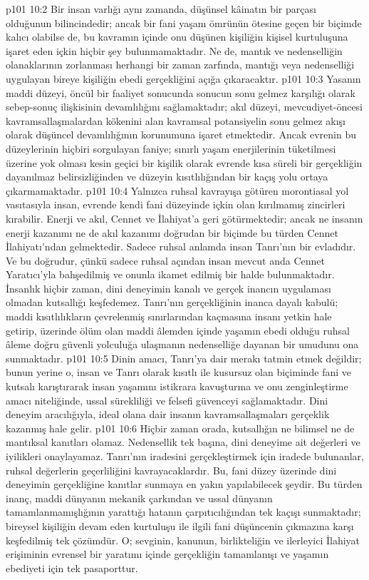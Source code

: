 \vs p101 10:2 Bir insan varlığı aynı zamanda, düşünsel kâinatın bir parçası olduğunun bilincindedir; ancak bir fani yaşam ömrünün ötesine geçen bir biçimde kalıcı olabilse de, bu kavramın içinde onu düşünen kişiliğin kişisel kurtuluşuna işaret eden içkin hiçbir şey bulunmamaktadır. Ne de, mantık ve nedenselliğin olanaklarının zorlanması herhangi bir zaman zarfında, mantığı veya nedenselliği uygulayan bireye kişiliğin ebedi gerçekliğini açığa çıkaracaktır.
\vs p101 10:3 Yasanın maddi düzeyi, öncül bir faaliyet sonucunda sonucun sonu gelmez karşılığı olarak sebep\hyp{}sonuç ilişkisinin devamlılığını sağlamaktadır; akıl düzeyi, mevcudiyet\hyp{}öncesi kavramsallaşmalardan kökenini alan kavramsal potansiyelin sonu gelmez akışı olarak düşüncel devamlılığının korunumuna işaret etmektedir. Ancak evrenin bu düzeylerinin hiçbiri sorgulayan faniye; sınırlı yaşam enerjilerinin tüketilmesi üzerine yok olması kesin geçici bir kişilik olarak evrende kısa süreli bir gerçekliğin dayanılmaz belirsizliğinden ve düzeyin kısıtlılığından bir kaçış yolu ortaya çıkarmamaktadır.
\vs p101 10:4 Yalnızca ruhsal kavrayışa götüren morontiasal yol vasıtasıyla insan, evrende kendi fani düzeyinde içkin olan kırılmamış zincirleri kırabilir. Enerji ve akıl, Cennet ve İlahiyat’a geri götürmektedir; ancak ne insanın enerji kazanımı ne de akıl kazanımı doğrudan bir biçimde bu türden Cennet İlahiyatı’ndan gelmektedir. Sadece ruhsal anlamda insan Tanrı’nın bir evladıdır. Ve bu doğrudur, çünkü sadece ruhsal açından insan mevcut anda Cennet Yaratıcı’yla bahşedilmiş ve onunla ikamet edilmiş bir halde bulunmaktadır. İnsanlık hiçbir zaman, dini deneyimin kanalı ve gerçek inancın uygulaması olmadan kutsallığı keşfedemez. Tanrı’nın gerçekliğinin inanca dayalı kabulü; maddi kısıtlılıkların çevrelenmiş sınırlarından kaçmasına insanı yetkin hale getirip, üzerinde ölüm olan maddi âlemden içinde yaşamın ebedi olduğu ruhsal âleme doğru güvenli yolculuğa ulaşmanın nedenselliğe dayanan bir umudunu ona sunmaktadır.
\vs p101 10:5 Dinin amacı, Tanrı’ya dair merakı tatmin etmek değildir; bunun yerine o, insan ve Tanrı olarak kısıtlı ile kusursuz olan biçiminde fani ve kutsalı karıştırarak insan yaşamını istikrara kavuşturma ve onu zenginleştirme amacı niteliğinde, ussal sürekliliği ve felsefi güvenceyi sağlamaktadır. Dini deneyim aracılığıyla, ideal olana dair insanın kavramsallaşmaları gerçeklik kazanmış hale gelir.
\vs p101 10:6 Hiçbir zaman orada, kutsallığın ne bilimsel ne de mantıksal kanıtları olamaz. Nedensellik tek başına, dini deneyime ait değerleri ve iyilikleri onaylayamaz. Tanrı’nın iradesini gerçekleştirmek için iradede bulunanlar, ruhsal değerlerin geçerliliğini kavrayacaklardır. Bu, fani düzey üzerinde dini deneyimin gerçekliğine kanıtlar sunmaya en yakın yapılabilecek şeydir. Bu türden inanç, maddi dünyanın mekanik çarkından ve ussal dünyanın tamamlanmamışlığının yarattığı hatanın çarpıtıcılığından tek kaçışı sunmaktadır; bireysel kişiliğin devam eden kurtuluşu ile ilgili fani düşüncenin çıkmazına karşı keşfedilmiş tek çözümdür. O; sevginin, kanunun, birlikteliğin ve ilerleyici İlahiyat erişiminin evrensel bir yaratımı içinde gerçekliğin tamamlanışı ve yaşamın ebediyeti için tek pasaporttur.
